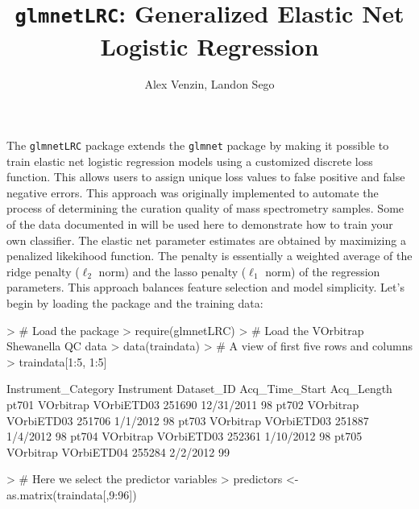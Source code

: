 \documentclass{article}
\begin{document}
 


\title{{\tt glmnetLRC}: Generalized Elastic Net Logistic Regression \\}
\author{Alex Venzin, Landon Sego}
\maketitle

The {\tt glmnetLRC} package extends the {\tt glmnet} package by making it possible to train elastic net logistic regression models using a customized discrete loss function.  This allows users to assign unique loss values to false positive and false negative errors. This approach was originally implemented to automate the process of determining the curation quality of mass spectrometry samples. Some of the data documented in \cite{thepaper} will be used here to demonstrate how to train your own classifier. The elastic net parameter estimates are obtained by maximizing a penalized likekihood function. The penalty is essentially a weighted average of the ridge penalty ($\ell_2$ norm) and the lasso penalty ($\ell_1$ norm) of the regression parameters.  This approach balances feature selection and model simplicity. 
Let's begin by loading the package and the training data:
\begin{Schunk}
\begin{Sinput}
> # Load the package
> require(glmnetLRC)
> # Load the VOrbitrap Shewanella QC data
> data(traindata)
> # A view of first five rows and columns
> traindata[1:5, 1:5]
\end{Sinput}
\begin{Soutput}
      Instrument_Category Instrument Dataset_ID Acq_Time_Start Acq_Length
pt701           VOrbitrap VOrbiETD03     251690     12/31/2011         98
pt702           VOrbitrap VOrbiETD03     251706       1/1/2012         98
pt703           VOrbitrap VOrbiETD03     251887       1/4/2012         98
pt704           VOrbitrap VOrbiETD03     252361      1/10/2012         98
pt705           VOrbitrap VOrbiETD04     255284       2/2/2012         99
\end{Soutput}
\begin{Sinput}
> # Here we select the predictor variables
> predictors <- as.matrix(traindata[,9:96])
\end{Sinput}
\end{Schunk}
\end{document}
